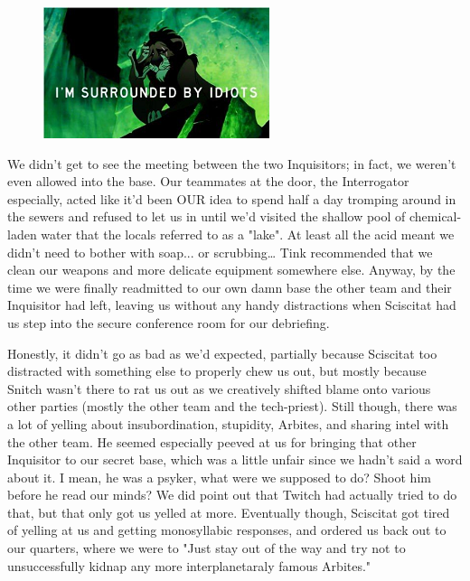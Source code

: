 \begin{figure}
	\begin{center}
		\includegraphics[width=\figwidth]{pics/18/43.png}
	\end{center}
\end{figure}
We didn't get to see the meeting between the two Inquisitors; 
in fact, we weren't even allowed into the base. 
Our teammates at the door, the Interrogator especially, acted like it'd been OUR idea to spend half a day tromping around in the sewers and refused to let us in until we'd visited the shallow pool of chemical-laden water that the locals referred to as a "lake". 
At least all the acid meant we didn't need to bother with soap... 
or scrubbing… Tink recommended that we clean our weapons and more delicate equipment somewhere else. 
Anyway, by the time we were finally readmitted to our own damn base the other team and their Inquisitor had left, leaving us without any handy distractions when Sciscitat had us step into the secure conference room for our debriefing.

Honestly, it didn't go as bad as we'd expected, partially because Sciscitat too distracted with something else to properly chew us out, but mostly because Snitch wasn't there to rat us out as we creatively shifted blame onto various other parties (mostly the other team and the tech-priest). 
Still though, there was a lot of yelling about insubordination, stupidity, Arbites, and sharing intel with the other team. 
He seemed especially peeved at us for bringing that other Inquisitor to our secret base, which was a little unfair since we hadn't said a word about it. 
I mean, he was a psyker, what were we supposed to do? 
Shoot him before he read our minds? 
We did point out that Twitch had actually tried to do that, but that only got us yelled at more. 
Eventually though, Sciscitat got tired of yelling at us and getting monosyllabic responses, and ordered us back out to our quarters, where we were to "Just stay out of the way and try not to unsuccessfully kidnap any more interplanetaraly famous Arbites."

